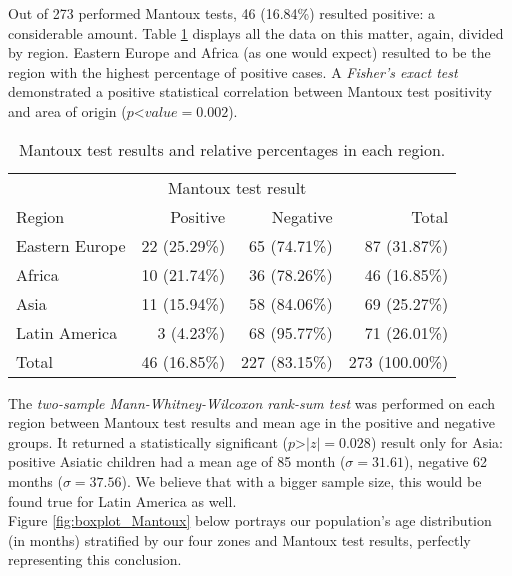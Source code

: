
Out of 273 performed Mantoux tests, 46 (16.84\%) resulted positive: a considerable amount. Table \ref{tab:mantouxbyregion} displays all the data on this matter, again, divided by region. Eastern Europe and Africa (as one would expect) resulted to be the region with the highest percentage of positive cases. A \textit{Fisher's exact test} demonstrated a positive statistical correlation between Mantoux test positivity and area of origin ($p$\textless$value=0.002$).

\begin{table}[H]
   \centering
   \begin{tabular}{l r r | r}
   	  & \multicolumn{2}{c}{Mantoux test result} & \\
   	  \cline{2-3}
      Region\footnotemark[5] & Positive & Negative & Total\\
      \hline
      Eastern Europe & 22 (25.29\%) & 65 (74.71\%) & 87 (31.87\%)\\
      Africa & 10 (21.74\%) & 36 (78.26\%) & 46 (16.85\%)\\
      Asia & 11 (15.94\%) & 58 (84.06\%) & 69 (25.27\%)\\
      Latin America & 3 (4.23\%) & 68 (95.77\%) & 71 (26.01\%)\\
      \hline
      Total & 46 (16.85\%) & 227 (83.15\%) & 273 (100.00\%)\\
   \end{tabular}
   \caption{Mantoux test results and relative percentages in each region.}
    \label{tab:mantouxbyregion}
\end{table}


The \textit{two-sample Mann-Whitney-Wilcoxon rank-sum test} was performed on each region between Mantoux test results and mean age in the positive and negative groups. It returned a statistically significant ($p$\textgreater$|z|=0.028$) result only for Asia: positive Asiatic children had a mean age of 85 month ($\sigma=31.61$), negative 62 months ($\sigma=37.56$). We believe that with a bigger sample size, this would be found true for Latin America as well.\\
Figure \ref{fig:boxplot_Mantoux} below portrays our population's age distribution (in months) stratified by our four zones and Mantoux test results, perfectly representing this conclusion.

